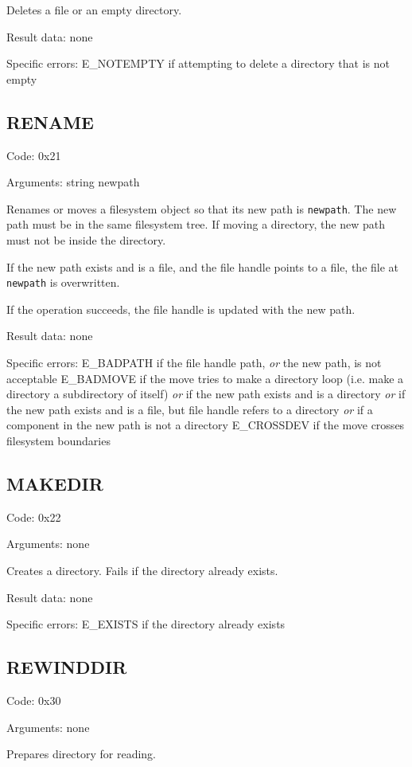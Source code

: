 Deletes a file or an empty directory.

Result data: none

Specific errors:
	E\_NOTEMPTY if attempting to delete a directory that is not empty

\subsection{RENAME}

Code: 0x21

Arguments:
string newpath

Renames or moves a filesystem object so that its new path is {\tt newpath}. The new path must be in the same
filesystem tree. If moving a directory, the new path must not be inside the directory.

If the new path exists and is a file, and the file handle points to a file, the file at {\tt newpath} is
overwritten.

If the operation succeeds, the file handle is updated with the new path.

Result data: none

Specific errors:
	E\_BADPATH if the file handle path, {\it or} the new path, is not acceptable
	E\_BADMOVE if the move tries to make a directory loop (i.e. make a directory a subdirectory of itself)
		{\it or} if the new path exists and is a directory
		{\it or} if the new path exists and is a file, but file handle refers to a directory
		{\it or} if a component in the new path is not a directory
	E\_CROSSDEV if the move crosses filesystem boundaries

\subsection{MAKEDIR}

Code: 0x22

Arguments: none

Creates a directory. Fails if the directory already exists.

Result data: none

Specific errors:
	E\_EXISTS if the directory already exists

\subsection{REWINDDIR}

Code: 0x30

Arguments: none

Prepares directory for reading.

